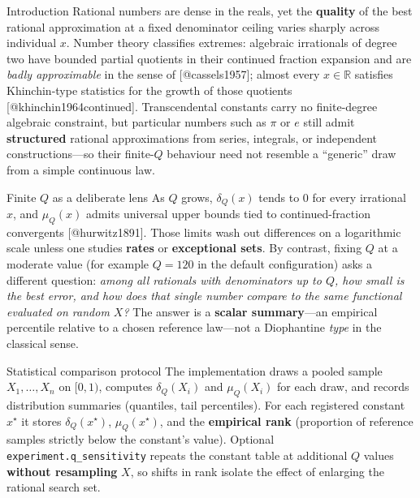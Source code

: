 \documentclass[
  ignorenonframetext,
]{beamer}
\author{\texorpdfstring{}{}}
\date{}
\begin{document}
\begin{frame}[fragile]{Introduction}
\protect{}\label{introduction}
Rational numbers are dense in the reals, yet the \textbf{quality} of the
best rational approximation at a fixed denominator ceiling varies
sharply across individual \(x\). Number theory classifies extremes:
algebraic irrationals of degree two have bounded partial quotients in
their continued fraction expansion and are \emph{badly approximable} in
the sense of {[}@cassels1957{]}; almost every \(x \in \mathbb{R}\)
satisfies Khinchin-type statistics for the growth of those quotients
{[}@khinchin1964continued{]}. Transcendental constants carry no
finite-degree algebraic constraint, but particular numbers such as
\(\pi\) or \(e\) still admit \textbf{structured} rational approximations
from series, integrals, or independent constructions---so their
finite-\(Q\) behaviour need not resemble a ``generic'' draw from a
simple continuous law.

\begin{block}{Finite \(Q\) as a deliberate lens}
\protect{}\label{finite-q-as-a-deliberate-lens}
As \(Q\) grows, \(\delta_Q(x)\) tends to \(0\) for every irrational
\(x\), and \(\mu_Q(x)\) admits universal upper bounds tied to
continued-fraction convergents {[}@hurwitz1891{]}. Those limits wash out
differences on a logarithmic scale unless one studies \textbf{rates} or
\textbf{exceptional sets}. By contrast, fixing \(Q\) at a moderate value
(for example \(Q=120\) in the default configuration) asks a different
question: \emph{among all rationals with denominators up to \(Q\), how
small is the best error, and how does that single number compare to the
same functional evaluated on random \(X\)?} The answer is a
\textbf{scalar summary}---an empirical percentile relative to a chosen
reference law---not a Diophantine \emph{type} in the classical sense.
\end{block}

\begin{block}{Statistical comparison protocol}
\protect{}\label{statistical-comparison-protocol}
The implementation draws a pooled sample \(X_1,\ldots,X_n\) on
\([0,1)\), computes \(\delta_Q(X_i)\) and \(\mu_Q(X_i)\) for each draw,
and records distribution summaries (quantiles, tail percentiles). For
each registered constant \(x^\star\) it stores \(\delta_Q(x^\star)\),
\(\mu_Q(x^\star)\), and the \textbf{empirical rank} (proportion of
reference samples strictly below the constant's value). Optional
\texttt{experiment.q\_sensitivity} repeats the constant table at
additional \(Q\) values \textbf{without resampling} \(X\), so shifts in
rank isolate the effect of enlarging the rational search set.
\end{block}


\end{frame}
\end{document}
